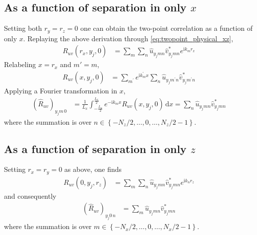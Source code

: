 \documentclass[letterpaper,11pt,nointlimits,reqno]{amsart}
\newcommand{\ii}{\ensuremath{\mathrm{i}}}
\begin{document}
\subsection{As a function of separation in only $x$}

Setting both $r_y = r_z = 0$ one can obtain the two-point correlation as a
function of only $x$.  Replaying the above derivation through
\eqref{eq:twopoint_physical_xz},
\begin{align}
R_{uv} \left( r_x, y_j, 0 \right)
  &=
     \sum_{m}
     \sum_{n}
     \hat{u}_{y_j m n}
     \hat{v}^\ast_{y_j m n}
     e^{\ii k_m r_x}
\end{align}
Relabeling $x = r_x$ and $m'=m$,
\begin{align}
R_{uv} \left( x, y_j, 0 \right)
  &=
     \sum_{m^\prime}
     e^{\ii k_m^\prime x}
     \sum_{n}
     \hat{u}_{y_j m^\prime n}
     \hat{v}^\ast_{y_j m^\prime n}
\end{align}
Applying a Fourier transformation in $x$,
\begin{align}
     \left(\hat{R}_{uv}\right)_{y_j m \, 0}
  &=
     \frac{1}{L_x}
     \int_{-\frac{L_x}{2}}^{\frac{L_x}{2}}
     e^{-\ii k_m x}
     R_{uv} \left( x, y_j, 0 \right)
     \,\mathrm{d}x
   =
     \sum_{n}
     \hat{u}_{y_j m n}
     \hat{v}^\ast_{y_j m n}
\end{align}
where the summation is over $n \in \left\{-N_z/2, \dots, 0, \dots,
N_z/2-1\right\}$.

\subsection{As a function of separation in only $z$}

Setting $r_x = r_y = 0$ as above, one finds
\begin{align}
R_{uv} \left( 0, y_j, r_z \right)
  &=
     \sum_{m}
     \sum_{n}
     \hat{u}_{y_j m n}
     \hat{v}^\ast_{y_j m n}
     e^{\ii k_n r_z}
\end{align}
and consequently
\begin{align}
     \left(\hat{R}_{uv}\right)_{y_j 0 \, n}
  &=
     \sum_{m}
     \hat{u}_{y_j m n}
     \hat{v}^\ast_{y_j m n}
\end{align}
where the summation is over $m \in \left\{-N_x/2, \dots, 0, \dots,
N_x/2-1\right\}$.
\end{document}
